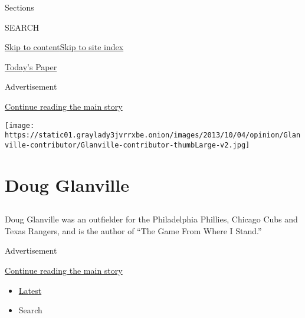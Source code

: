 Sections

SEARCH

\protect\hyperlink{site-content}{Skip to
content}\protect\hyperlink{site-index}{Skip to site index}

\href{https://myaccount.nytimes3xbfgragh.onion/auth/login?response_type=cookie\&client_id=vi}{}

\href{https://www.nytimes3xbfgragh.onion/section/todayspaper}{Today's
Paper}

Advertisement

\protect\hyperlink{after-top}{Continue reading the main story}

\texttt{[image: https://static01.graylady3jvrrxbe.onion/images/2013/10/04/opinion/Glanville-contributor/Glanville-contributor-thumbLarge-v2.jpg]}

\hypertarget{doug-glanville}{%
\section{Doug Glanville}\label{doug-glanville}}

\subsection{}

Doug Glanville was an outfielder for the Philadelphia Phillies, Chicago
Cubs and Texas Rangers, and is the author of ``The Game From Where I
Stand.''

Advertisement

\protect\hyperlink{after-mid1}{Continue reading the main story}

\begin{itemize}
\tightlist
\item
  \protect\hyperlink{stream-panel}{Latest}
\item
  Search
\end{itemize}

